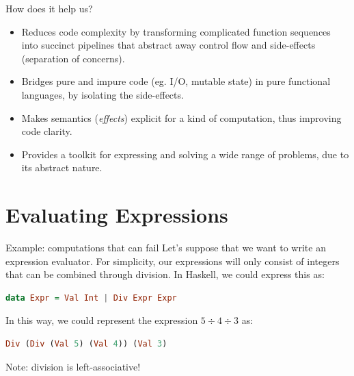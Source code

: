 \documentclass{beamer}
\begin{document}
\begin{frame}{How does it help us?}
    \begin{itemize}[<+-| alert@+>]
        \setlength \itemsep{1em}
        \item Reduces code complexity by transforming complicated function
              sequences into succinct pipelines that abstract away control
              flow and side-effects (separation of concerns).
        \item Bridges pure and impure code (eg. I/O, mutable state) in pure
              functional languages, by isolating the side-effects.
        \item Makes semantics (\textit{effects}) explicit for a kind of
              computation, thus improving code clarity.
        \item Provides a toolkit for expressing and solving a wide range
              of problems, due to its abstract nature.
    \end{itemize}
\end{frame}

\section{Evaluating Expressions}

\begin{frame}[fragile]{Example: computations that can fail}
    Let's suppose that we want to write an expression evaluator. For
    simplicity, our expressions will only consist of integers that can
    be combined through division. In Haskell, we could express this as:

    \begin{minipage}{\linewidth} \hspace{1cm}
    \begin{lstlisting}[language=haskell, numbers=none, frame=none]
      data Expr = Val Int | Div Expr Expr
    \end{lstlisting}
    \end{minipage} \hspace{1cm} 

    In this way, we could represent the expression $5 \div 4 \div 3$ as:

    \begin{minipage}{\linewidth} \hspace{1cm}
    \begin{lstlisting}[language=haskell, numbers=none, frame=none]
      Div (Div (Val 5) (Val 4)) (Val 3)
    \end{lstlisting}
    \end{minipage} \hspace{1cm}

    Note: division is left-associative!
\end{frame}
\end{document}
